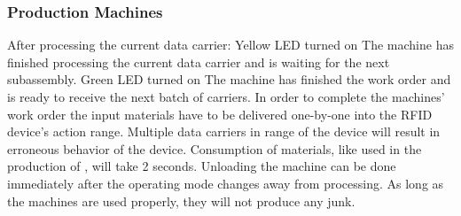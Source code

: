 \documentclass[12pt,twoside]{article}
\begin{document}
\subsubsection{Production Machines}
After processing the current data carrier: Yellow LED turned on The
machine has finished processing the current data carrier and is
waiting for the next subassembly. Green LED turned on The machine has
finished the work order and is ready to receive the next batch of
carriers. In order to complete the machines' work order the input
materials have to be delivered one-by-one into the RFID device's
action range. Multiple data carriers in range of the device will
result in erroneous behavior of the device. Consumption of materials,
like  used in the production of , will take 2 seconds. Unloading
the machine can be done immediately after the operating mode changes
away from processing. As long as the machines are used properly, they
will not produce any junk.
\end{document}
